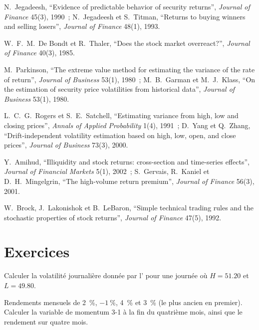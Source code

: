 \begin{omsources}
\item N.~Jegadeesh, ``Evidence of predictable behavior of security returns'', \emph{Journal of Finance} 45(3), 1990~; N.~Jegadeesh et
S.~Titman, ``Returns to buying winners and selling losers'', \emph{Journal of Finance} 48(1), 1993.
\item W.~F.~M.~De Bondt et R.~Thaler, ``Does the stock market overreact?'', \emph{Journal of Finance} 40(3), 1985.
\item M.~Parkinson, ``The extreme value method for estimating the variance of the rate of return'', \emph{Journal of Business} 53(1),
1980~; M.~B.~Garman et M.~J.~Klass, ``On the estimation of security price volatilities from historical data'', \emph{Journal of
Business} 53(1), 1980.
\item L.~C.~G.~Rogers et S.~E.~Satchell, ``Estimating variance from high, low and closing prices'', \emph{Annals of Applied
Probability} 1(4), 1991~; D.~Yang et Q.~Zhang, ``Drift-independent volatility estimation based on high, low, open, and close prices'',
\emph{Journal of Business} 73(3), 2000.
\item Y.~Amihud, ``Illiquidity and stock returns: cross-section and time-series effects'', \emph{Journal of Financial Markets} 5(1),
2002~; S.~Gervais, R.~Kaniel et D.~H.~Mingelgrin, ``The high-volume return premium'', \emph{Journal of Finance} 56(3), 2001.
\item W.~Brock, J.~Lakonishok et B.~LeBaron, ``Simple technical trading rules and the stochastic properties of stock returns'',
\emph{Journal of Finance} 47(5), 1992.
\end{omsources}

\section{Exercices}

\begin{exercise}[$\star$]\label{exo:rs:price-and-volume-features:1}
Calculer la volatilité journalière donnée par l' pour une journée où $H = 51.20$ et $L = 49.80$.
\end{exercise}

\begin{exercise}[$\star$]\label{exo:rs:price-and-volume-features:2}
Rendements mensuels de 2~\%, $-1~\%$, 4~\% et 3~\% (le plus ancien en premier). Calculer la variable de momentum 3-1 à la fin du quatrième mois,
ainsi que le rendement sur quatre mois.
\end{exercise}

